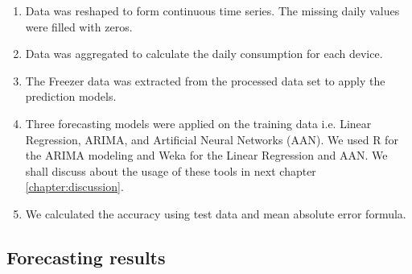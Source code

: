 \begin{enumerate}
\item Data was reshaped to form continuous time series. The missing daily values were filled with zeros.
\item Data was aggregated to calculate the daily consumption for each device.
\item  The Freezer data was extracted from the processed data set to apply the prediction models.
\item  Three forecasting models were applied on the training data i.e. Linear Regression, ARIMA, and Artificial Neural Networks (AAN). We used R for the ARIMA modeling and Weka for the Linear Regression and AAN. We shall discuss about the usage of these tools in next chapter \ref{chapter:discussion}. 
\item We calculated the accuracy using test data and mean absolute error formula.  
\end{enumerate} 

\subsection{Forecasting results}

